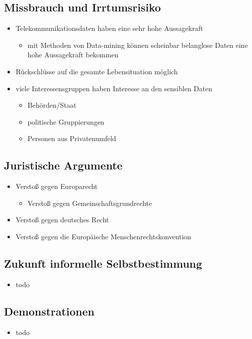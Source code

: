   \subsection{Missbrauch und Irrtumsrisiko}
    \begin{frame}
      \begin{itemize}
        \item
          Telekommunikationsdaten haben eine sehr hohe Aussagekraft
      \begin{itemize}
         \item mit Methoden von Data-mining können scheinbar belanglose Daten eine hohe Aussagekraft bekommen
      \end{itemize}
        \item
          Rückschlüsse auf die gesamte Lebensituation möglich
 \item viele Interessensgruppen haben Interesse an den sensiblen Daten
          \begin{itemize}
         \item Behörden/Staat
         \item politische Gruppierungen
         \item Personen aus Privatenumfeld
      \end{itemize}
 
      \end{itemize}
    \end{frame}

  \subsection{Juristische Argumente}
    \begin{frame}
      \begin{itemize}
        \item Verstoß gegen Europarecht
           \begin{itemize}
         \item Verstoß gegen Gemeinschaftsgrundrechte
      \end{itemize}
        \item Verstoß gegen deutsches Recht
        \item Verstoß gegen die Europäische Menschenrechtskonvention
      \end{itemize}
    \end{frame}

  \subsection{Zukunft informelle Selbstbestimmung}
    \begin{frame}
      \begin{itemize}
        \item
          todo
  

      \end{itemize}
    \end{frame}

  \subsection{Demonstrationen}
    \begin{frame}
      \begin{itemize}
        \item
          todo
  
      \end{itemize}
    \end{frame}
